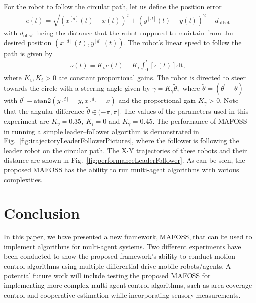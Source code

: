%
For the robot to follow the circular path, let us define the position error
%
\begin{align*}
    e(t) = \sqrt{(x^{[d]}(t) - x(t))^2+(y^{[d]}(t) - y(t))^2} - d_{\text{offset}}
\end{align*} 
%
with $d_{\text{offset}}$ being the distance that the robot supposed to maintain from the desired position $(x^{[d]}(t),y^{[d]}(t)).$ The robot's linear speed to follow the path is given by  
%
\begin{align*}
  \nu(t) = K_ve(t) + K_i\int_0^t[e(t)]\mathrm{dt},
\end{align*}
%
where $K_v, K_i>0$ are constant proportional gains. The robot is directed to steer towards the circle with a steering angle given by%
%
  $\gamma = K_\gamma \tilde\theta,$ %
%
where $\tilde\theta = (\theta^{'} - \theta)$ with $\theta^{'} = \mathrm{atan2}(y^{[d]}-y,x^{[d]}-x)$ and the proportional gain $K_\gamma>0.$ Note that the angular difference $\tilde\theta\in (-\pi,\pi].$ The values of the parameters used in this experiment are $K_v = 0.35,~K_i = 0$ and $K_\gamma = 0.45.$ The performance of MAFOSS in running a simple leader--follower algorithm is demonstrated in Fig.~\ref{fig:trajectoryLeaderFollowerPictures}, where the follower is following the leader robot on the circular path. The X-Y trajectories of these robots and their distance are shown in Fig.~\ref{fig:performanceLeaderFollower}. As can be seen, the proposed MAFOSS has the ability to run multi-agent algorithms with various complexities. 




\section{Conclusion}
\label{sec:conclusion}
In this paper, we have presented a new framework, MAFOSS, that can be used to implement algorithms for multi-agent systems. Two different experiments have been conducted to show the proposed framework's ability to conduct motion control algorithms using multiple differential drive mobile robots/agents. A potential future work will include testing the proposed MAFOSS for implementing more complex multi-agent control algorithms, such as area coverage control and cooperative estimation while incorporating sensory measurements. 



